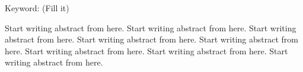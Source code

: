 \begin{EnAbstract}
    \begin{EnAbstractItems}
        \noindent \text Keyword: (Fill it)

    \end{EnAbstractItems}

    \begin{EnAbstractDescription}
        Start writing abstract from here. Start writing abstract from here. Start writing abstract from here. Start writing abstract from here. Start writing abstract from here. Start writing abstract from here. Start writing abstract from here. Start writing abstract from here.
    \end{EnAbstractDescription}
    
\end{EnAbstract}


